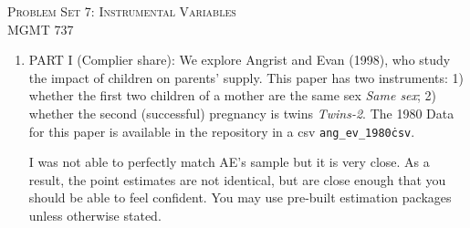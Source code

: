 \documentclass[11pt, a4paper]{article}
\begin{document}
\begin{center}
  {\Large \textsc{Problem Set 7: Instrumental Variables}}\\
  MGMT 737
\end{center}

\begin{enumerate}
\item PART I (Complier share): We explore Angrist and Evan (1998), who
  study the impact of children on parents' supply. This paper has two
  instruments: 1) whether the first two children of a mother are the
  same sex \textit{Same sex}; 2) whether the second (successful)
  pregnancy is twins \textit{Twins-2}. The 1980 Data for this paper is
  available in the repository in a csv \texttt{ang\_ev\_1980\.csv}.

  I was not able to perfectly match AE's sample but it is very
  close. As a result, the point estimates are not identical, but are
  close enough that you should be able to feel confident. You may use pre-built estimation packages unless otherwise stated.


\end{enumerate}
\end{document}

